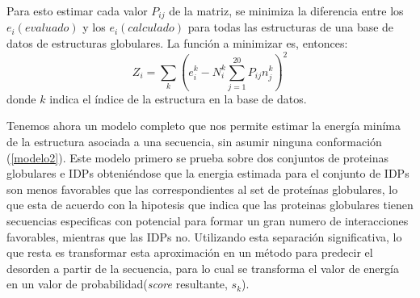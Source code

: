 Para esto estimar cada valor $P_{ij}$ de la matriz, se minimiza la diferencia entre los $e_i(evaluado)$ y los $e_i(calculado)$ para todas las estructuras de una base de datos de estructuras globulares.
La función a minimizar es, entonces: 
\begin{equation}\label{z}
Z_i = \sum_{k} (e_i^k - N_i^k\sum_{j=1}^{20} P_{ij}n_{j}^k)^2   
\end{equation}
\noindent donde $k$ indica el índice de la estructura en la base de datos. 



Tenemos ahora un modelo completo que nos permite estimar la energía miníma de la estructura asociada a una secuencia, sin asumir ninguna conformación (\ref{modelo2}).
Este modelo primero se prueba sobre dos conjuntos de proteinas globulares e IDPs obteniéndose que la energia estimada para el conjunto de IDPs son menos favorables que las correspondientes al set de proteínas globulares,
lo que esta de acuerdo con la hipotesis que indica que las proteinas globulares tienen secuencias especificas con potencial para formar un gran numero de interacciones favorables, mientras que las IDPs no.
Utilizando esta separación significativa, lo que resta es transformar esta aproximación en un método para predecir el desorden a partir de la secuencia, 
para lo cual se transforma el valor de energía en un valor de probabilidad(\textit{score} resultante, $s_k$).




